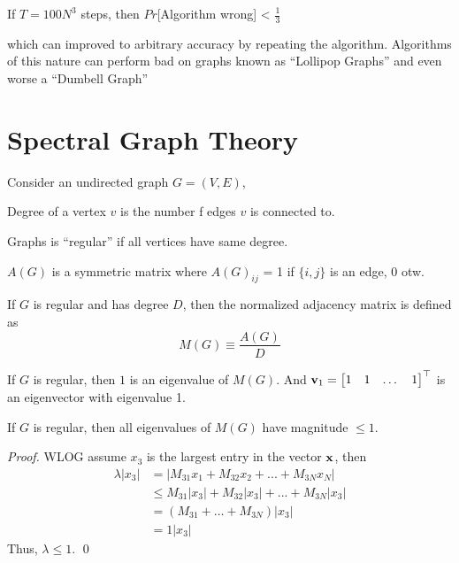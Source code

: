 \begin{proposition}[Alenilaus, 80s]
	If $T = 100N^3$ steps, then $Pr$[Algorithm wrong] < $\frac{1}{3}$
\end{proposition}
which can improved to arbitrary accuracy by repeating the algorithm. Algorithms of this nature can perform bad on graphs known as ``Lollipop Graphs'' and even worse a ``Dumbell Graph''


\section{Spectral Graph Theory}
Consider an undirected graph $G = (V, E)$, 
\begin{definition}[Degree]
	Degree of a vertex $v$ is the number f edges $v$ is connected to.
\end{definition}

\begin{definition}[Regular]
	Graphs is ``regular'' if all vertices have same degree. 
\end{definition}

\begin{definition}
	$A(G)$ is a symmetric matrix where $A(G)_{ij}$ = 1 if $\{i, j\}$ is an edge, 0 otw. 
\end{definition}

\begin{definition}
	If $G$ is regular and has degree $D$, then the normalized adjacency matrix is defined as 
	\begin{equation}
		M(G) \equiv \frac{A(G)}{D}
	\end{equation}
\end{definition}

\begin{lemma}
	If $G$ is regular, then $1$ is an eigenvalue of $M(G)$. And $\mathbf{v}_1 = \begin{bmatrix}
		1 & 1 & \dots & 1
	\end{bmatrix}^\top$ is an eigenvector with eigenvalue 1. 
\end{lemma}

\begin{proposition}
	\label{prop:eigenvalues_of_regular_graphs}
	If $G$ is regular, then all eigenvalues of $M(G)$ have magnitude $\leq 1$. 
\end{proposition}

\begin{proof}
	WLOG assume $x_3$ is the largest entry in the vector $\mathbf{x}$, then
	\begin{align}
		\lambda |x_3| 
		&= |M_{31}x_1 + M_{32}x_2 + ... + M_{3N}x_N| \\
		&\leq M_{31}|x_3| + M_{32}|x_3| + ... + M_{3N} |x_3| \\
		&= (M_{31} + \ldots + M_{3N}) |x_3| \\
		&= 1 |x_3|
	\end{align}
	Thus, $\lambda \leq 1$. \qed
\end{proof}

